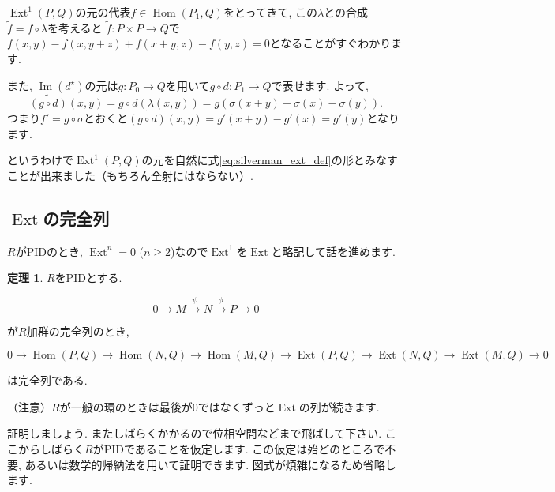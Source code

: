 \documentclass{jsarticle}
\newcommand{\makeop}[1]{\mathop{\mathrm{#1}}\nolimits}
\def\Im{\makeop{Im}}
\def\Hom{\makeop{Hom}}
\def\Ext{\makeop{Ext}}
\theoremstyle{definition}
\newtheorem{theorem}{定理}
\numberwithin{theorem}{section}
\begin{document}
$\Ext^1(P, Q)$の元の代表$f\in\Hom(P_1, Q)$をとってきて, この$\lambda$との合成$\tilde{f} = f\circ\lambda$を考えると
$\tilde{f} : P \times P \rightarrow Q$で$f(x, y) - f(x, y+z) + f(x+y, z) - f(y, z) = 0$となることがすぐわかります.

また, $\Im(d^\star)$の元は$g: P_0 \rightarrow Q$を用いて$g\circ d: P_1 \rightarrow Q$で表せます. よって,
\[
\widetilde{(g\circ d)} (x, y) = g\circ d(\lambda(x, y)) = g(\sigma(x+y) - \sigma(x) - \sigma(y)).
\]
つまり$f' = g\circ\sigma$とおくと$\widetilde{(g\circ d)}(x, y) = g'(x+y) - g'(x) = g'(y)$となります.

というわけで$\Ext^1(P, Q)$の元を自然に式\ref{eq:silverman_ext_def}の形とみなすことが出来ました（もちろん全射にはならない）.

\subsection{$\Ext$の完全列}
$R$がPIDのとき, $\Ext^n = 0$ ($n \geq 2$)なので$\Ext^1$を$\Ext$と略記して話を進めます.

\begin{theorem}
$R$をPIDとする.

\begin{equation*}
0 \rightarrow M \xrightarrow{\psi} N \xrightarrow{\phi} P \rightarrow 0
\end{equation*}

が$R$加群の完全列のとき,

\begin{equation*}
0 \rightarrow \Hom(P, Q) \rightarrow \Hom(N, Q) \rightarrow \Hom(M, Q) \rightarrow
\Ext(P, Q) \rightarrow \Ext(N, Q) \rightarrow \Ext(M, Q) \rightarrow 0
\end{equation*}

は完全列である.
\end{theorem}

（注意）$R$が一般の環のときは最後が$0$ではなくずっと$\Ext$の列が続きます.

証明しましょう. またしばらくかかるので位相空間などまで飛ばして下さい. ここからしばらく$R$がPIDであることを仮定します.
この仮定は殆どのところで不要, あるいは数学的帰納法を用いて証明できます. 図式が煩雑になるため省略します.
\end{document}
